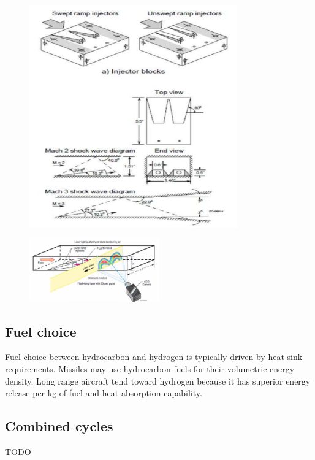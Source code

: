 \documentclass[12pt]{article}
\begin{document}
\begin{figure}[h!]
\centering
\includegraphics[width=0.8\textwidth]{figures/injescram.png}
\end{figure}

\begin{figure}[h!]
\centering
\includegraphics[width=0.5\textwidth]{figures/inje2.png}
\end{figure}

\subsection{Fuel choice}
Fuel choice between hydrocarbon and hydrogen is typically driven by heat-sink requirements. Missiles may use hydrocarbon fuels for their volumetric energy density. Long range aircraft tend toward hydrogen because it has superior energy release per kg of fuel and heat absorption capability.

\subsection{Combined cycles}

TODO
\end{document}
